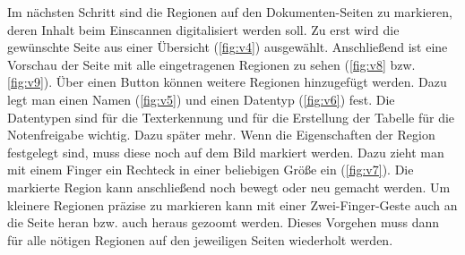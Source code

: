\documentclass[nomenclature, oneside, 150]{HSMW-Thesis}
\begin{document}
			Im nächsten Schritt sind die Regionen auf den Dokumenten-Seiten zu markieren, deren Inhalt beim Einscannen digitalisiert werden soll. Zu erst wird die gewünschte Seite aus einer Übersicht (\ref{fig:v4}) ausgewählt. Anschließend ist eine Vorschau der Seite mit alle eingetragenen Regionen zu sehen (\ref{fig:v8} bzw. \ref{fig:v9}). Über einen Button können weitere Regionen hinzugefügt werden. Dazu legt man einen Namen (\ref{fig:v5}) und einen Datentyp (\ref{fig:v6}) fest. Die Datentypen sind für die Texterkennung und für die Erstellung der Tabelle für die Notenfreigabe wichtig. Dazu später mehr. Wenn die Eigenschaften der Region festgelegt sind, muss diese noch auf dem Bild markiert werden. Dazu zieht man mit einem Finger ein Rechteck in einer beliebigen Größe ein (\ref{fig:v7}). Die markierte Region kann anschließend noch bewegt oder neu gemacht werden. Um kleinere Regionen präzise zu markieren kann mit einer Zwei-Finger-Geste auch an die Seite heran bzw. auch heraus gezoomt werden. Dieses Vorgehen muss dann für alle nötigen Regionen auf den jeweiligen Seiten wiederholt werden. 
\end{document}
